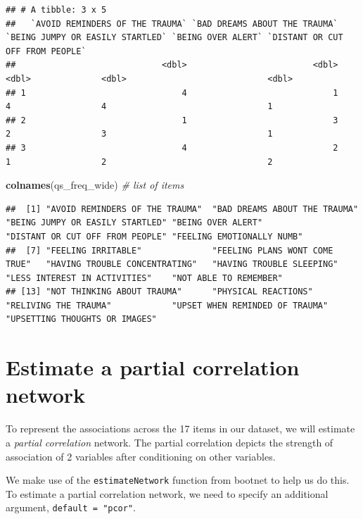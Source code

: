 \documentclass[
]{book}
\newenvironment{Shaded}{\begin{snugshade}}{\end{snugshade}}
\newcommand{\CommentTok}[1]{\textcolor[rgb]{0.56,0.35,0.01}{\textit{#1}}}
\newcommand{\FunctionTok}[1]{\textcolor[rgb]{0.13,0.29,0.53}{\textbf{#1}}}
\newcommand{\NormalTok}[1]{#1}
\begin{document}
\begin{verbatim}
## # A tibble: 3 x 5
##   `AVOID REMINDERS OF THE TRAUMA` `BAD DREAMS ABOUT THE TRAUMA` `BEING JUMPY OR EASILY STARTLED` `BEING OVER ALERT` `DISTANT OR CUT OFF FROM PEOPLE`
##                             <dbl>                         <dbl>                            <dbl>              <dbl>                            <dbl>
## 1                               4                             1                                4                  4                                1
## 2                               1                             3                                2                  3                                1
## 3                               4                             2                                1                  2                                2
\end{verbatim}

\begin{Shaded}
\begin{Highlighting}[]
\FunctionTok{colnames}\NormalTok{(qs\_freq\_wide) }\CommentTok{\# list of items }
\end{Highlighting}
\end{Shaded}

\begin{verbatim}
##  [1] "AVOID REMINDERS OF THE TRAUMA"  "BAD DREAMS ABOUT THE TRAUMA"    "BEING JUMPY OR EASILY STARTLED" "BEING OVER ALERT"               "DISTANT OR CUT OFF FROM PEOPLE" "FEELING EMOTIONALLY NUMB"      
##  [7] "FEELING IRRITABLE"              "FEELING PLANS WONT COME TRUE"   "HAVING TROUBLE CONCENTRATING"   "HAVING TROUBLE SLEEPING"        "LESS INTEREST IN ACTIVITIES"    "NOT ABLE TO REMEMBER"          
## [13] "NOT THINKING ABOUT TRAUMA"      "PHYSICAL REACTIONS"             "RELIVING THE TRAUMA"            "UPSET WHEN REMINDED OF TRAUMA"  "UPSETTING THOUGHTS OR IMAGES"
\end{verbatim}

\section{Estimate a partial correlation network}\label{estimate-a-partial-correlation-network}

To represent the associations across the 17 items in our dataset, we will estimate a \emph{partial correlation} network. The partial correlation depicts the strength of association of 2 variables after conditioning on other variables.

We make use of the \texttt{estimateNetwork} function from bootnet to help us do this. To estimate a partial correlation network, we need to specify an additional argument, \texttt{default\ =\ "pcor"}.
\end{document}
